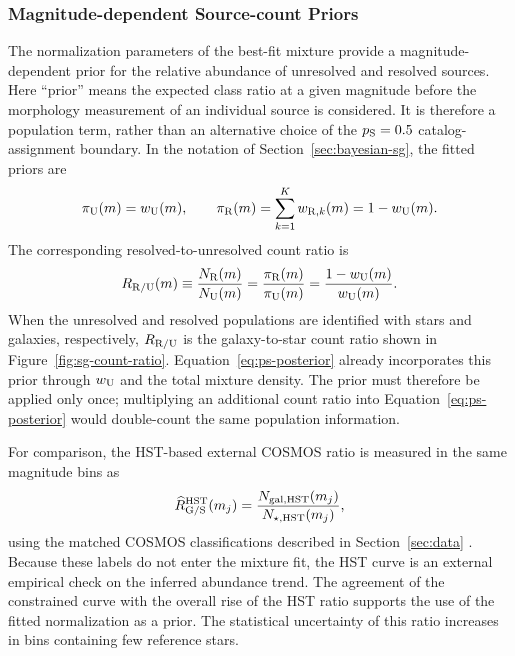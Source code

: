 \subsubsection{Magnitude-dependent Source-count Priors}
\label{sec:sg-priors}

The normalization parameters of the best-fit mixture provide a
magnitude-dependent prior for the relative abundance of unresolved and
resolved sources. Here ``prior'' means the expected class ratio at a given
magnitude before the morphology measurement of an individual source is
considered. It is therefore a population term, rather than an alternative
choice of the $p_{\rm S}=0.5$ catalog-assignment boundary. In the notation of
Section~\ref{sec:bayesian-sg}, the fitted priors are
\begin{equation}
    \pi_{\rm U}(m)=w_{\rm U}(m),
    \qquad
    \pi_{\rm R}(m)=\sum_{k=1}^{K}w_{{\rm R},k}(m)
                  =1-w_{\rm U}(m).
    \label{eq:mixture-priors}
\end{equation}
The corresponding resolved-to-unresolved count ratio is
\begin{equation}
    R_{\rm R/U}(m)
    \equiv\frac{N_{\rm R}(m)}{N_{\rm U}(m)}
    =\frac{\pi_{\rm R}(m)}{\pi_{\rm U}(m)}
    =\frac{1-w_{\rm U}(m)}{w_{\rm U}(m)}.
    \label{eq:count-prior}
\end{equation}
When the unresolved and resolved populations are identified with stars and
galaxies, respectively, $R_{\rm R/U}$ is the galaxy-to-star count ratio shown
in Figure~\ref{fig:sg-count-ratio}. Equation~\ref{eq:ps-posterior} already
incorporates this prior through $w_{\rm U}$ and the total mixture density. The
prior must therefore be applied only once; multiplying an additional count
ratio into Equation~\ref{eq:ps-posterior} would double-count the same
population information.

For comparison, the HST-based external COSMOS ratio is measured in the same
magnitude bins as
\begin{equation}
    \widehat{R}_{\rm G/S}^{\rm HST}(m_j)
    =\frac{N_{{\rm gal},{\rm HST}}(m_j)}
           {N_{\star,{\rm HST}}(m_j)},
    \label{eq:reference-count-ratio}
\end{equation}
using the matched COSMOS classifications described in
Section~\ref{sec:data} \citep{Leauthaud2007COSMOSACS,Robin2007COSMOSStars,
Weaver2022}. Because these labels do not enter the mixture fit, the HST curve
is an external empirical check on the inferred abundance trend. The agreement
of the constrained curve with the overall rise of the HST ratio supports the
use of the fitted normalization as a prior. The statistical uncertainty of
this ratio increases in bins containing few reference stars.

